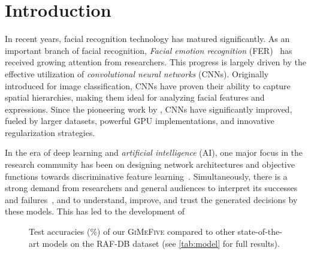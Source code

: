 \section{Introduction}
\label{sec:intro}

In recent years, facial recognition technology has matured significantly. 
As an important branch of facial recognition, 
\textit{Facial emotion recognition} (FER)~\cite{Ko18,JainSS19,YinTLS019,Malik0R21} has received growing attention from researchers. 
This progress is largely driven by the effective utilization of \textit{convolutional neural networks} (CNNs). 
Originally introduced for image classification, 
CNNs have proven their ability to capture spatial hierarchies, 
making them ideal for analyzing facial features and expressions. 
Since the pioneering work by \citet{Lecun89Backpropagation}, 
CNNs have significantly improved, fueled by larger datasets, 
powerful GPU implementations, 
and innovative regularization strategies. 

In the era of deep learning and \textit{artificial intelligence} (AI), 
one major focus in the research community has been on designing network architectures 
and objective functions towards discriminative feature learning~\cite{HeZRS16, liu2017learning, wen2016discriminative}. 
Simultaneously, 
there is a strong demand from researchers and general audiences to interpret its successes and failures~\cite{GoodfellowSS14}, 
and to understand, improve, and trust the generated decisions by these models. 
This has led to the development of 

\begin{figure}[ht]
  \centering
  \caption{Test accuracies (\%) of our \textsc{GiMeFive} 
  compared to other state-of-the-art models on the RAF-DB dataset (see \cref{tab:model} for full results).} 
  \label{fig:acc}
\end{figure}

